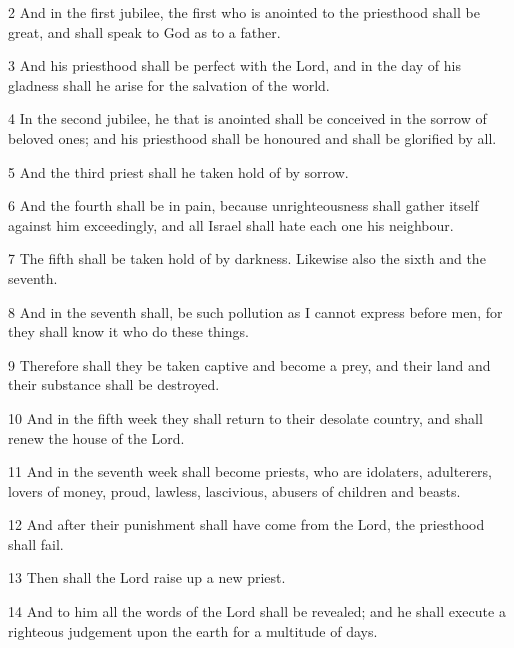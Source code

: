 \par 2 And in the first jubilee, the first who is anointed to the priesthood shall be great, and shall speak to God as to a father.

\par 3 And his priesthood shall be perfect with the Lord, and in the day of his gladness shall he arise for the salvation of the world.

\par 4 In the second jubilee, he that is anointed shall be conceived in the sorrow of beloved ones; and his priesthood shall be honoured and shall be glorified by all.

\par 5 And the third priest shall he taken hold of by sorrow.

\par 6 And the fourth shall be in pain, because unrighteousness shall gather itself against him exceedingly, and all Israel shall hate each one his neighbour.

\par 7 The fifth shall be taken hold of by darkness. Likewise also the sixth and the seventh.

\par 8 And in the seventh shall, be such pollution as I cannot express before men, for they shall know it who do these things.

\par 9 Therefore shall they be taken captive and become a prey, and their land and their substance shall be destroyed.

\par 10 And in the fifth week they shall return to their desolate country, and shall renew the house of the Lord.

\par 11 And in the seventh week shall become priests, who are idolaters, adulterers, lovers of money, proud, lawless, lascivious, abusers of children and beasts.

\par 12 And after their punishment shall have come from the Lord, the priesthood shall fail.

\par 13 Then shall the Lord raise up a new priest.

\par 14 And to him all the words of the Lord shall be revealed; and he shall execute a righteous judgement upon the earth for a multitude of days.

